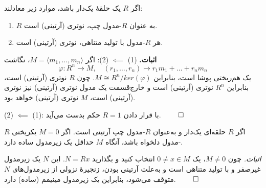 \begin{frame}
    \begin{theorem}
        اگر $R$ یک حلقهٔ یک‌دار باشد، موارد زیر معادلند:
        \begin{enumerate}
            \item $R$ به عنوان $R$-مدول چپ، نوترى (آرتینی) است.
            \item هر $R$-مدول با تولید متناهی، نوترى (آرتینی) است.
        \end{enumerate}
    \end{theorem}
    \textbf{اثبات.} (1) $\impliedby$ (2): اگر $M=\langle m_1,\dots,m_n\rangle$، نگاشت
    \[
        \varphi: R^n \to M,\quad (r_1,\dots,r_n) \mapsto r_1m_1+\dots+r_nm_n
    \]
    یک هم‌ریختی پوشا است، بنابراین  $M \cong R^n/ker(\varphi)$.
    چون $R$ نوترى (آرتینی)
    است،‌ بنابراین
    $R^n$
    نوترى (آرتینی)
    است و خارج‌قسمت یک مدول نوترى (آرتینی) نیز نوترى (آرتینی) است، $M$ نوترى (آرتینی) خواهد بود.

    (2) $\impliedby$ (1):
    با قرار دادن
    \(R = 1\)
    حکم بدست می‌آید.
    \hfill
    \(\qed\)
\end{frame}




\begin{frame}
    \begin{theorem}
        اگر
        $R$
        حلقه‌ای
        یک‌دار و به‌عنوان
        $R$-مدول
        چپ آرتینی است.
        اگر
        $M=0$
        یکریختی
        $R$-مدول
        دلخواه باشد،
        آنگاه $M$ حداقل یک زیرمدول ساده دارد.
    \end{theorem}
    \textit{اثبات.} چون $M\neq 0$، یک $0\neq x \in M$ انتخاب کنید و بگذارید $N=Rx$. این $N$ یک زیرمدول غیرصفر و با تولید متناهی است و به‌علت آرتینی بودن، زنجیرهٔ نزولی از زیرمدول‌های $N$ متوقف می‌شود، بنابراین یک زیرمدول مینیمم (ساده) دارد.
\hfill
    \(\qed\)
\end{frame}





